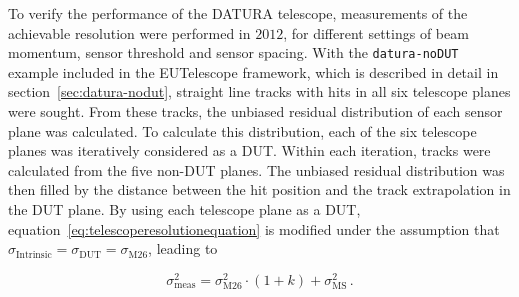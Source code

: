 To verify the performance of the {DATURA} telescope, measurements of the
achievable resolution were performed in $2012$, for different settings of beam
momentum, sensor threshold and sensor spacing. With the \texttt{datura-noDUT}
example included in the {EUTelescope} framework, which is described in detail in
section~\ref{sec:datura-nodut}, straight line tracks with hits in all six
telescope planes were sought. From these tracks, the unbiased residual
distribution of each sensor plane was calculated. To calculate this
distribution, each of the six telescope planes was iteratively considered as a
DUT. Within each iteration, tracks were calculated from the five non-DUT planes.
The unbiased residual distribution was then filled by the distance between the
hit position and the track extrapolation in the DUT plane. By using each
telescope plane as a DUT, equation~\ref{eq:telescoperesolutionequation} is
modified under the assumption that $\sigma_{\textrm{Intrinsic}} =
\sigma_{\textrm{DUT}} = \sigma_{\textrm{M26}}$, leading to

\begin{equation}
\label{eq:telescoperesolutionequation_2}
\sigma_{\textrm{meas}}^2 = \sigma_{\textrm{M26}}^2 \cdot \left( 1 + k \right) +
\sigma_{\textrm{MS}}^2\,.
\end{equation}

